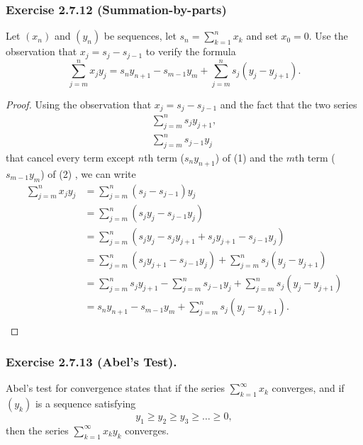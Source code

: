 \subsubsection{Exercise 2.7.12 (Summation-by-parts)} Let \( (x_n)  \) and \( (y_n)  \) be sequences, let \( s_n = \sum_{ k=1  }^{  n  } x_k \) and set \( x_0 = 0  \). Use the observation that \( x_j = s_j - s_{j-1}  \) to verify the formula
\[  \sum_{ j=m  }^{  n  } x_j y_j = s_n y_{n+1 } - s_{m-1}y_m + \sum_{ j=m  }^{  n  } s_j (y_j - y_{j+1} ). \]
\begin{proof}
    Using the observation that \( x_j = s_j - s_{j-1}  \) and the fact that the two series 
    \begin{align*}
        \sum_{ j=m  }^{ n } s_j y_{j+1}, \tag{1}\\ 
        \sum_{ j=m }^{ n } s_{j-1} y_j \tag{2}
    \end{align*} that cancel every term except \( n \)th term (\( s_n y_{n+1} \)) of (1) and the \( m \)th term (\( s_{m-1} y_m \)) of (2) , we can write 
    \begin{align*}
        \sum_{ j=m  }^{ n  } x_j y_j &= \sum_{ j=m }^{ n } (s_j - s_{j-1}) y_j \\
                                     &= \sum_{ j=m }^{ n } (s_j y_j - s_{j-1}y_j) \\
                                     &= \sum_{ j=m }^{ n } (s_j y_j - s_j y_{j+1} + s_j y_{j+1} - s_{j-1} y_{j} ) \\
                                     &= \sum_{ j=m }^{ n } (s_j y_{j+1} - s_{j-1}y_j) + \sum_{ j=m  }^{  n  } s_j (y_j - y_{j+1} ) \\
                                     &= \sum_{ j=m  }^{  n } s_j y_{j+1} - \sum_{ j=m  }^{  n  } s_{j-1} y_j + \sum_{ j=m  }^{ n  } s_j (y_j - y_{j+1} ) \\ \tag{1}
                                     &= s_n y_{n+1} - s_{m-1}y_{m} + \sum_{ j=m  }^{ n  } s_j (y_j - y_{j+1} ). \\
    \end{align*}
\end{proof}

\subsubsection{Exercise 2.7.13 (Abel's Test).} Abel's test for convergence states that if the series \( \sum_{ k=1  }^{  \infty  } x_k  \) converges, and if \( (y_k)  \) is a sequence satisfying \[  y_1 \geq y_2 \geq y_3 \geq \dots \geq  0,  \] 
then the series \( \sum_{ k=1 }^{ \infty  } x_k y_k  \) converges.

